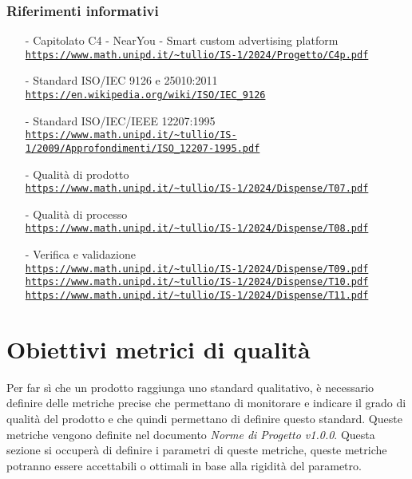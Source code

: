 \documentclass[11pt]{article}
\begin{document}
\begin{justify}
\subsubsection{Riferimenti informativi}
\begin{itemize}
    \item[-] Capitolato C4 - NearYou -
Smart custom advertising platform\\
    \textcolor{blue}{\texttt{\url{https://www.math.unipd.it/~tullio/IS-1/2024/Progetto/C4p.pdf}}}
    \item[-] Standard ISO/IEC 9126 e 25010:2011 \label{ISO 9126 25010} \\
    \textcolor{blue}{\texttt{\url{https://en.wikipedia.org/wiki/ISO/IEC_9126}}}
    \item[-] Standard ISO/IEC/IEEE 12207:1995 \label{ISO 12207:1995}\\
    \textcolor{blue}{\texttt{\url{https://www.math.unipd.it/~tullio/IS-1/2009/Approfondimenti/ISO_12207-1995.pdf}}}
    \item[-] Qualità di prodotto\\
    \textcolor{blue}{\texttt{\url{https://www.math.unipd.it/~tullio/IS-1/2024/Dispense/T07.pdf}}}
    \item[-] Qualità di processo\\
    \textcolor{blue}{\texttt{\url{https://www.math.unipd.it/~tullio/IS-1/2024/Dispense/T08.pdf}}}
    \item[-] Verifica e validazione\\
    \textcolor{blue}{\texttt{\url{https://www.math.unipd.it/~tullio/IS-1/2024/Dispense/T09.pdf}}}\\
    \textcolor{blue}{\texttt{\url{https://www.math.unipd.it/~tullio/IS-1/2024/Dispense/T10.pdf}}}\\
    \textcolor{blue}{\texttt{\url{https://www.math.unipd.it/~tullio/IS-1/2024/Dispense/T11.pdf}}}



\end{itemize}
\newpage

\section{Obiettivi metrici di qualità}
Per far sì che un prodotto raggiunga uno standard qualitativo, è necessario definire delle metriche precise che permettano di monitorare e indicare il grado di qualità del prodotto e che quindi permettano di definire questo standard.
Queste metriche vengono definite nel documento \textit{Norme di Progetto v1.0.0}.
Questa sezione si occuperà di definire i parametri di queste metriche, queste metriche potranno essere accettabili o ottimali in base alla rigidità del parametro.\\


\end{justify}
\end{document}
